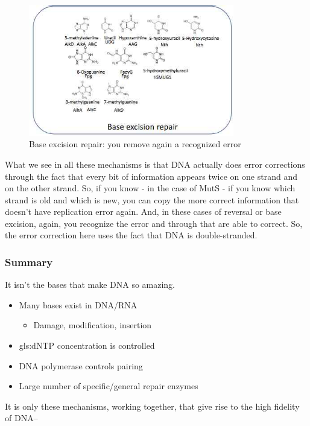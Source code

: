 \documentclass[]{article}
\begin{document}
\begin{figure}[H]
	\begin{center}
		\caption{Base excision repair: you remove again a recognized error}\label{fig:MMR2}
		\includegraphics[width=0.8\textwidth]{MMR2}
	\end{center}
\end{figure}

What we see in all these mechanisms
is that DNA actually does
error corrections through the fact that
every bit of information appears twice
on one strand and on the other strand.
So, if you know -
in the case of MutS -
if you know which strand is old
and which is new,
you can copy the more correct information
that doesn't have replication error again.
And, in these cases of reversal
or base excision,
again, you recognize the error
and through that are able to correct.
So, the error correction here
uses the fact that
DNA is double-stranded.

\subsubsection{Summary}
 It isn’t the bases that make DNA so amazing.
\begin{itemize}
	\item Many bases exist in DNA/RNA
	\begin{itemize}
		\item Damage, modification, insertion
	\end{itemize}
	\item \gls{gls:dNTP} concentration is controlled
	\item DNA polymerase controls	pairing
	\item Large number of specific/general repair enzymes
\end{itemize}

It is only these mechanisms, working together, that give rise to the high fidelity of DNA--\cite{kunkel2004dna}
\end{document}
